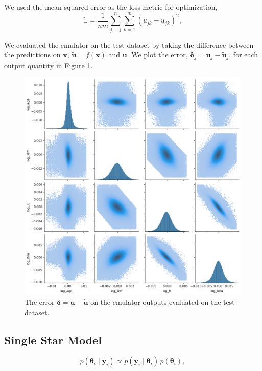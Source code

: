 \documentclass[fleqn,usenatbib]{mnras}
\renewcommand*{\vec}[1]{\boldsymbol{#1}}
\newcommand{\obs}{{\vec{y}}}
\newcommand{\inputs}{{\vec{x}}}
\newcommand{\outputs}{{\vec{u}}}
\newcommand{\pred}{{\tilde{\outputs}}}
\newcommand{\error}{{\vec{\delta}}}
\begin{document}
We used the mean squared error as the loss metric for optimization,
%
\begin{equation}
    \mathbb{L} = \frac{1}{nm} \sum_{j=1}^{n} \sum_{k=1}^{m} (u_{jk} - \tilde u_{jk})^2,
\end{equation} 

We evaluated the emulator on the test dataset by taking the difference between the predictions on \(\inputs\), \(\pred = f(\inputs)\) and \(\outputs\). We plot the error, \(\error_j = \outputs_j - \pred_j\), for each output quantity in Figure \ref{fig:error}.

\begin{figure}
    \centering
    \includegraphics[width=1.0\linewidth]{figures/error.png}
    \caption{The error \(\vec\error = \outputs - \pred\) on the emulator outputs evaluated on the test dataset.}
    \label{fig:error}
\end{figure}

\subsection{Single Star Model}

%
\begin{equation}
    p(\vec \theta_i \mid \obs_i) \propto p(\obs_i \mid \vec \theta_i) \, p(\vec\theta_i),
\end{equation}
%
\end{document}
